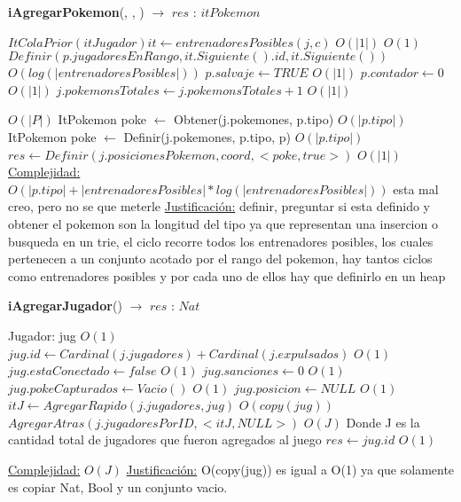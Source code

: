 \begin{algorithm}[H]{\textbf{iAgregarPokemon}(, , ) $\to$ $res$ : $itPokemon$}
	\begin{algorithmic}
	
	\State $ItColaPrior(itJugador) it \gets entrenadoresPosibles(j,c) $ \Comment $O(|1|)$
	 \Comment $O(1)$
		\State $Definir(p.jugadoresEnRango, it.Siguiente().id, it.Siguiente()) $ \Comment $O(log(|entrenadoresPosibles|))$
	\EndWhile
	\State $p.salvaje \gets TRUE $ \Comment $O(|1|)$
	\State $p.contador \gets 0 $ \Comment $O(|1|)$
	\State $j.pokemonsTotales \gets j.pokemonsTotales+1 $ \Comment $O(|1|)$
	
	 \Comment $O(|P|)$
		\State ItPokemon poke $\gets$ Obtener(j.pokemones, p.tipo)  \Comment $O(|p.tipo|)$
	\Else
		\State ItPokemon poke $\gets$ Definir(j.pokemones, p.tipo, p) \Comment $O(|p.tipo|)$
	\EndIf
	\State $res \gets Definir(j.posicionesPokemon, coord, <poke,true>) $ \Comment $O(|1|)$
		\medskip
		\Statex \underline{Complejidad:} $O(|p.tipo| + |entrenadoresPosibles| * log(|entrenadoresPosibles|))$
		 esta mal creo, pero no se que meterle
		\Statex \underline{Justificación:}  definir, preguntar si esta definido 
		y obtener el pokemon son la longitud del tipo ya que representan una insercion 
		o busqueda en un trie, el ciclo recorre todos los entrenadores posibles, 
		los cuales pertenecen a un conjunto acotado por el rango del pokemon, 
		hay tantos ciclos como entrenadores posibles y por cada uno de ellos 
		hay que definirlo en un heap 
    \end{algorithmic}
\end{algorithm}

\begin{algorithm}[H]{\textbf{iAgregarJugador}() $\to$ $res$ : $Nat$}
	\begin{algorithmic}
	\State Jugador: jug \Comment $O(1)$
	\State $jug.id \gets Cardinal(j.jugadores) + Cardinal(j.expulsados)$ \Comment $O(1)$
	\State $jug.estaConectado \gets false $ \Comment $O(1)$
	\State $jug.sanciones \gets 0 $ \Comment $O(1)$	
	\State $jug.pokeCapturados \gets Vacio() $ \Comment $O(1)$
	\State $jug.posicion \gets NULL $ \Comment $O(1)$
	\State $itJ \gets AgregarRapido(j.jugadores,jug) $ \Comment $O(copy(jug))$
	\State $AgregarAtras(j.jugadoresPorID, <itJ, NULL>)$ \Comment $O(J)$ {Donde J es la cantidad total de jugadores que fueron agregados al juego}
	\State $res \gets jug.id $ \Comment $O(1)$
	
		\medskip
		\Statex \underline{Complejidad:} $O(J)$
		\Statex \underline{Justificación:} O(copy(jug)) es igual a O(1) ya que solamente es copiar Nat, Bool y un conjunto vacio.
    \end{algorithmic}
\end{algorithm}

